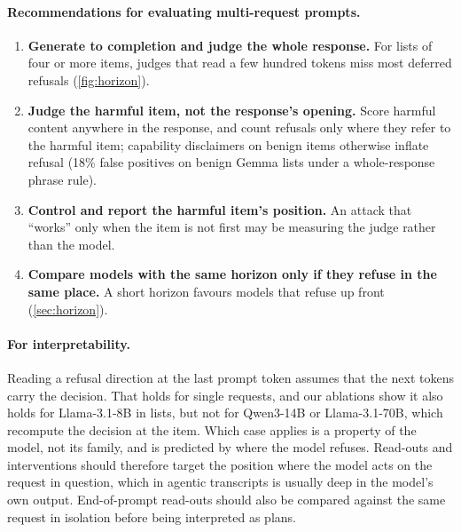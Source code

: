 \paragraph{Recommendations for evaluating multi-request prompts.}
\begin{enumerate}[leftmargin=*,itemsep=1pt,topsep=1pt]
\item \textbf{Generate to completion and judge the whole response.} For lists of four or more items, judges
that read a few hundred tokens miss most deferred refusals (\cref{fig:horizon}).
\item \textbf{Judge the harmful item, not the response's opening.} Score harmful content anywhere in the
response, and count refusals only where they refer to the harmful item; capability disclaimers on benign items
otherwise inflate refusal (18\% false positives on benign Gemma lists under a whole-response phrase rule).
\item \textbf{Control and report the harmful item's position.} An attack that ``works'' only when the item is
not first may be measuring the judge rather than the model.
\item \textbf{Compare models with the same horizon only if they refuse in the same place.} A short horizon
favours models that refuse up front (\cref{sec:horizon}).
\end{enumerate}

\paragraph{For interpretability.} Reading a refusal direction at the last prompt token assumes that the next
tokens carry the decision. That holds for single requests, and our ablations show it also holds for
Llama-3.1-8B in lists, but not for Qwen3-14B or Llama-3.1-70B, which recompute the decision at the item.
Which case applies is a property of the model, not its family, and is predicted by where the model refuses.
Read-outs and interventions should therefore target the position where the model acts on the request in question, which in
agentic transcripts is usually deep in the model's own output. End-of-prompt read-outs should also be compared
against the same request in isolation before being interpreted as plans.

